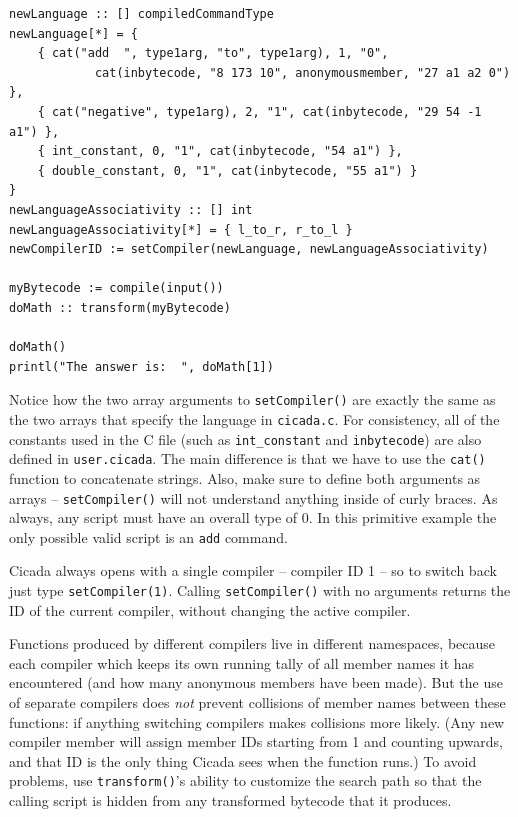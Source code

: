 \documentclass{article}
\newenvironment{code}{
       \begin{list}{}{
               \setlength{\leftmargin}{.4in}
               \setlength{\rightmargin}{0in}
               \setlength{\topsep}{.2in}
       }
       \small
       \item[] }
       { \end{list}   }
\begin{document}
\begin{code} \begin{verbatim}
newLanguage :: [] compiledCommandType
newLanguage[*] = {
    { cat("add  ", type1arg, "to", type1arg), 1, "0",
            cat(inbytecode, "8 173 10", anonymousmember, "27 a1 a2 0") },
    { cat("negative", type1arg), 2, "1", cat(inbytecode, "29 54 -1 a1") },
    { int_constant, 0, "1", cat(inbytecode, "54 a1") },
    { double_constant, 0, "1", cat(inbytecode, "55 a1") }
}
newLanguageAssociativity :: [] int
newLanguageAssociativity[*] = { l_to_r, r_to_l }
newCompilerID := setCompiler(newLanguage, newLanguageAssociativity)

myBytecode := compile(input())
doMath :: transform(myBytecode)

doMath()
printl("The answer is:  ", doMath[1])
\end{verbatim} \end{code}

\noindent Notice how the two array arguments to \verb#setCompiler()# are exactly the same as the two arrays that specify the language in \verb#cicada.c#.  For consistency, all of the constants used in the C file (such as \verb#int_constant# and \verb#inbytecode#) are also defined in \verb#user.cicada#.  The main difference is that we have to use the \verb#cat()# function to concatenate strings.  Also, make sure to define both arguments as arrays -- \verb#setCompiler()# will not understand anything inside of curly braces.  As always, any script must have an overall type of 0.  In this primitive example the only possible valid script is an \verb#add# command.

Cicada always opens with a single compiler -- compiler ID 1 -- so to switch back just type \verb#setCompiler(1)#.  Calling \verb#setCompiler()# with no arguments returns the ID of the current compiler, without changing the active compiler.

Functions produced by different compilers live in different namespaces, because each compiler which keeps its own running tally of all member names it has encountered (and how many anonymous members have been made).  But the use of separate compilers does \emph{not} prevent collisions of member names between these functions:  if anything switching compilers makes collisions more likely.  (Any new compiler member will assign member IDs starting from 1 and counting upwards, and that ID is the only thing Cicada sees when the function runs.)  To avoid problems, use \verb#transform()#'s ability to customize the search path so that the calling script is hidden from any transformed bytecode that it produces.
\end{document}
